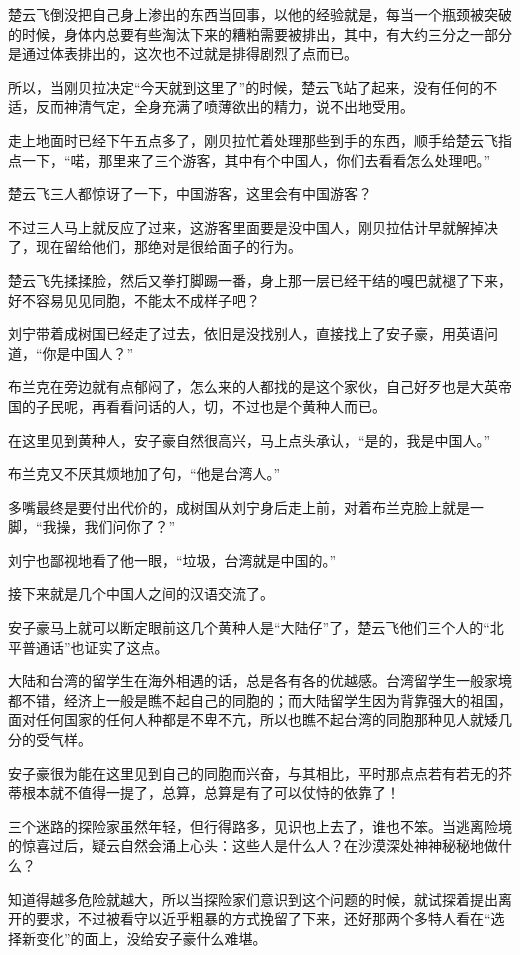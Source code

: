楚云飞倒没把自己身上渗出的东西当回事，以他的经验就是，每当一个瓶颈被突破的时候，身体内总要有些淘汰下来的糟粕需要被排出，其中，有大约三分之一部分是通过体表排出的，这次也不过就是排得剧烈了点而已。

所以，当刚贝拉决定“今天就到这里了”的时候，楚云飞站了起来，没有任何的不适，反而神清气定，全身充满了喷薄欲出的精力，说不出地受用。

走上地面时已经下午五点多了，刚贝拉忙着处理那些到手的东西，顺手给楚云飞指点一下，“喏，那里来了三个游客，其中有个中国人，你们去看看怎么处理吧。”

楚云飞三人都惊讶了一下，中国游客，这里会有中国游客？

不过三人马上就反应了过来，这游客里面要是没中国人，刚贝拉估计早就解掉决了，现在留给他们，那绝对是很给面子的行为。

楚云飞先揉揉脸，然后又拳打脚踢一番，身上那一层已经干结的嘎巴就褪了下来，好不容易见见同胞，不能太不成样子吧？

刘宁带着成树国已经走了过去，依旧是没找别人，直接找上了安子豪，用英语问道，“你是中国人？”

布兰克在旁边就有点郁闷了，怎么来的人都找的是这个家伙，自己好歹也是大英帝国的子民呢，再看看问话的人，切，不过也是个黄种人而已。

在这里见到黄种人，安子豪自然很高兴，马上点头承认，“是的，我是中国人。”

布兰克又不厌其烦地加了句，“他是台湾人。”

多嘴最终是要付出代价的，成树国从刘宁身后走上前，对着布兰克脸上就是一脚，“我操，我们问你了？”

刘宁也鄙视地看了他一眼，“垃圾，台湾就是中国的。”

接下来就是几个中国人之间的汉语交流了。

安子豪马上就可以断定眼前这几个黄种人是“大陆仔”了，楚云飞他们三个人的“北平普通话”也证实了这点。

大陆和台湾的留学生在海外相遇的话，总是各有各的优越感。台湾留学生一般家境都不错，经济上一般是瞧不起自己的同胞的；而大陆留学生因为背靠强大的祖国，面对任何国家的任何人种都是不卑不亢，所以也瞧不起台湾的同胞那种见人就矮几分的受气样。

安子豪很为能在这里见到自己的同胞而兴奋，与其相比，平时那点点若有若无的芥蒂根本就不值得一提了，总算，总算是有了可以仗恃的依靠了！

三个迷路的探险家虽然年轻，但行得路多，见识也上去了，谁也不笨。当逃离险境的惊喜过后，疑云自然会涌上心头：这些人是什么人？在沙漠深处神神秘秘地做什么？

知道得越多危险就越大，所以当探险家们意识到这个问题的时候，就试探着提出离开的要求，不过被看守以近乎粗暴的方式挽留了下来，还好那两个多特人看在“选择新变化”的面上，没给安子豪什么难堪。

